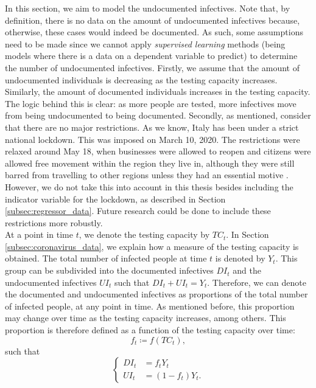 \documentclass[12pt]{article}
\begin{document}
	In this section, we aim to model the undocumented infectives. Note that, by definition, there is no data on the amount of undocumented infectives because, otherwise, these cases would indeed be documented. As such, some assumptions need to be made since we cannot apply \textit{supervised learning} methods (being models where there is a data on a dependent variable to predict) to determine the number of undocumented infectives. Firstly, we assume that the amount of undocumented individuals is decreasing as the testing capacity increases. Similarly, the amount of documented individuals increases in the testing capacity. The logic behind this is clear: as more people are tested, more infectives move from being undocumented to being documented. Secondly, as mentioned, \textcite{li2020undocumented} consider that there are no major restrictions. As we know, Italy has been under a strict national lockdown. This was imposed on March 10, 2020. The restrictions were relaxed around May 18, when businesses were allowed to reopen and citizens were allowed free movement within the region they live in, although they were still barred from travelling to other regions unless they had an essential motive \parencite{severgnini2020relaxLockdown}. However, we do not take this into account in this thesis besides including the indicator variable for the lockdown, as described in Section \ref{subsec:regressor_data}. Future research could be done to include these restrictions more robustly.\\
	
	At a point in time $t$, we denote the testing capacity by $TC_t$. In Section \ref{subsec:coronavirus_data}, we explain how a measure of the testing capacity is obtained. The total number of infected people at time $t$ is denoted by $Y_t$. This group can be subdivided into the documented infectives $DI_t$ and the undocumented infectives $UI_t$ such that $DI_t + UI_t = Y_t$. Therefore, we can denote the documented and undocumented infectives as proportions of the total number of infected people, at any point in time. As mentioned before, this proportion may change over time as the testing capacity increases, among others. This proportion is therefore defined as a function of the testing capacity over time:
	\begin{equation} \label{eq:f_t}
	f_t \coloneqq f(TC_t),
	\end{equation}
	such that
	\begin{equation*}
    	\begin{cases}
        	DI_t &= f_tY_t \\
        	UI_t &= (1-f_t)Y_t.
    	\end{cases}
	\end{equation*}
	
\end{document}
